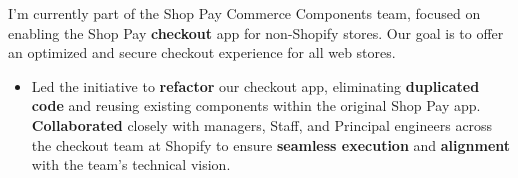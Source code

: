 \vfill
{}
I'm currently part of the Shop Pay Commerce Components team, focused on enabling the Shop Pay \textbf{checkout} app for non-Shopify stores. Our goal is to offer an optimized and secure checkout experience for all web stores.
\medskip
\begin{itemize}
    \item Led the initiative to \textbf{refactor} our checkout app, eliminating \textbf{duplicated code} and reusing existing components within the original Shop Pay app. \textbf{Collaborated} closely with managers, Staff, and Principal engineers across the checkout team at Shopify to ensure \textbf{seamless execution} and \textbf{alignment} with the team's technical vision.
\end{itemize}

